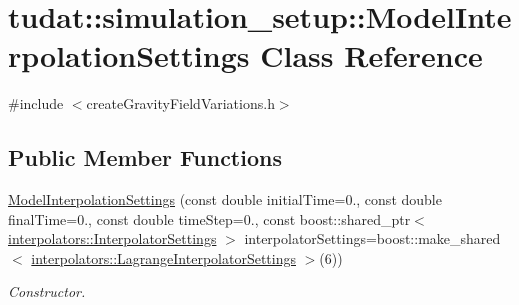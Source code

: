 \hypertarget{classtudat_1_1simulation__setup_1_1ModelInterpolationSettings}{}\section{tudat\+:\+:simulation\+\_\+setup\+:\+:Model\+Interpolation\+Settings Class Reference}
\label{classtudat_1_1simulation__setup_1_1ModelInterpolationSettings}


{\ttfamily \#include $<$create\+Gravity\+Field\+Variations.\+h$>$}

\subsection*{Public Member Functions}
\begin{DoxyCompactItemize}
\item 
\hyperlink{classtudat_1_1simulation__setup_1_1ModelInterpolationSettings_a87aa5eb1389709c989e6d32b72ce3c64}{Model\+Interpolation\+Settings} (const double initial\+Time=0., const double final\+Time=0., const double time\+Step=0., const boost\+::shared\+\_\+ptr$<$ \hyperlink{classtudat_1_1interpolators_1_1InterpolatorSettings}{interpolators\+::\+Interpolator\+Settings} $>$ interpolator\+Settings=boost\+::make\+\_\+shared$<$ \hyperlink{classtudat_1_1interpolators_1_1LagrangeInterpolatorSettings}{interpolators\+::\+Lagrange\+Interpolator\+Settings} $>$(6))
\begin{DoxyCompactList}\small\item\em Constructor. \end{DoxyCompactList}\end{DoxyCompactItemize}

